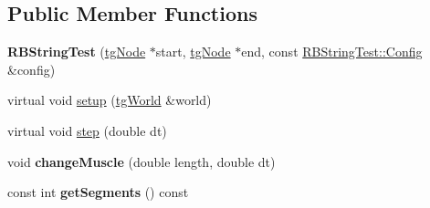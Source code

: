 \subsection*{Public Member Functions}
\begin{DoxyCompactItemize}
\item 
\hypertarget{class_r_b_string_test_a4b8d44963dba6b7d377a87721f3bd84a}{{\bfseries R\-B\-String\-Test} (\hyperlink{classtg_node}{tg\-Node} $\ast$start, \hyperlink{classtg_node}{tg\-Node} $\ast$end, const \hyperlink{struct_r_b_string_test_1_1_config}{R\-B\-String\-Test\-::\-Config} \&config)}\label{class_r_b_string_test_a4b8d44963dba6b7d377a87721f3bd84a}

\item 
virtual void \hyperlink{class_r_b_string_test_a2eed2174fc286c7ac261a2e6bdc8fb7e}{setup} (\hyperlink{classtg_world}{tg\-World} \&world)
\item 
virtual void \hyperlink{class_r_b_string_test_af105e21e1166be1546b1cd37c74b8d3b}{step} (double dt)
\item 
\hypertarget{class_r_b_string_test_a4b46fd27b78ce340c22e7bf552acf429}{void {\bfseries change\-Muscle} (double length, double dt)}\label{class_r_b_string_test_a4b46fd27b78ce340c22e7bf552acf429}

\item 
\hypertarget{class_r_b_string_test_a956286ef2cbefec200eac5406ac7a50c}{const int {\bfseries get\-Segments} () const }\label{class_r_b_string_test_a956286ef2cbefec200eac5406ac7a50c}


\end{DoxyCompactItemize}
